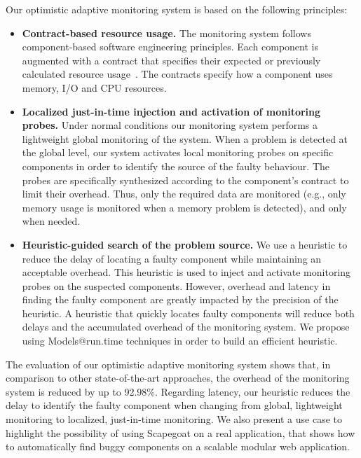 Our optimistic adaptive monitoring system is based on the following principles:
\begin{itemize}
\leftskip -.2in %
 \item \textbf{Contract-based resource usage.}
The monitoring system follows component-based software engineering principles. 
Each component is augmented with a contract that specifies their expected or previously calculated resource usage~\cite{Beugnard:1999:MCC:619042.621275}. 
The contracts specify how a component uses memory, I/O and CPU resources.
 \item \textbf{Localized just-in-time injection and activation of monitoring probes.} 
Under normal conditions our monitoring system performs a lightweight global monitoring of the system. 
When a problem is detected at the global level, our system activates local monitoring probes on specific components in order to identify the source of the faulty behaviour.
The probes are specifically synthesized according to the component's contract to limit their overhead.
Thus, only the required data are monitored (e.g., only memory usage is monitored when a memory problem is detected), and only when needed.
  \item \textbf{Heuristic-guided search of the problem source.} 
We use a heuristic to reduce the delay of locating a faulty component while maintaining an acceptable overhead.
This heuristic is used to inject and activate monitoring probes on the suspected components. 
However, overhead and latency in finding the faulty component are greatly impacted by the precision of the heuristic.
A heuristic that quickly locates faulty components will reduce both delays and the accumulated overhead of the monitoring system.
We propose using Models@run.time techniques in order to build an efficient heuristic.
\end{itemize}

The evaluation of our optimistic adaptive monitoring system shows that, in comparison to other state-of-the-art approaches, the overhead of the monitoring system is reduced by up to 92.98\%.
Regarding latency, our heuristic reduces the delay to identify the faulty component when changing from global, lightweight monitoring to localized, just-in-time monitoring.
We also present a use case to highlight the possibility of using Scapegoat on a real application, that shows how to automatically find buggy components on a scalable modular web application.

